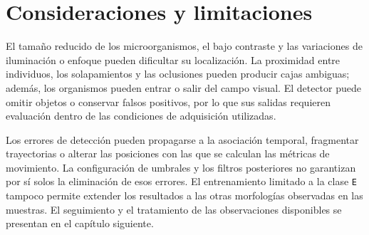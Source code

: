 \section{Consideraciones y limitaciones}

El tamaño reducido de los microorganismos, el bajo contraste y las variaciones de iluminación o enfoque pueden dificultar su localización. La proximidad entre individuos, los solapamientos y las oclusiones pueden producir cajas ambiguas; además, los organismos pueden entrar o salir del campo visual. El detector puede omitir objetos o conservar falsos positivos, por lo que sus salidas requieren evaluación dentro de las condiciones de adquisición utilizadas.

Los errores de detección pueden propagarse a la asociación temporal, fragmentar trayectorias o alterar las posiciones con las que se calculan las métricas de movimiento. La configuración de umbrales y los filtros posteriores no garantizan por sí solos la eliminación de esos errores. El entrenamiento limitado a la clase \texttt{E} tampoco permite extender los resultados a las otras morfologías observadas en las muestras. El seguimiento y el tratamiento de las observaciones disponibles se presentan en el capítulo siguiente.
